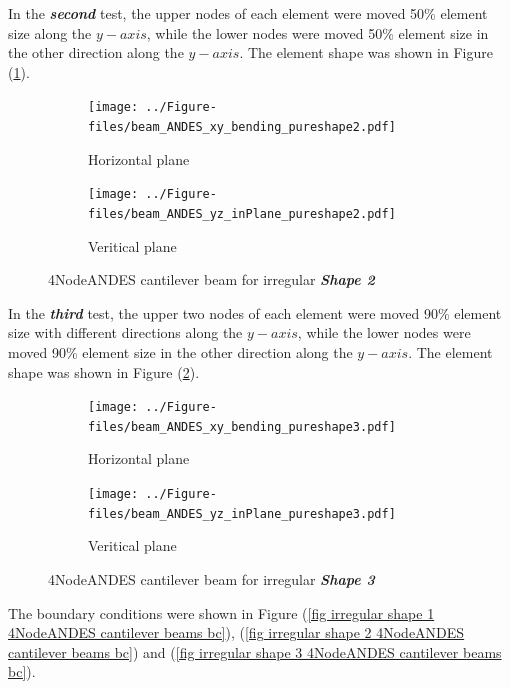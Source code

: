 \documentclass[fleqn,11pt]{article}
\begin{document}
In the \emph{\textbf{second}} test, the upper nodes of each element were moved 50\% element size along the $y-axis$, while the lower nodes were moved 50\% element size in the other direction along the $y-axis$. The element shape was shown in Figure (\ref{fig irregular shape 2 4NodeANDES cantilever beams }).


\begin{figure}[H]
  \centering
    \begin{subfigure}{0.5\textwidth}
      \centering
      \texttt{[image: ../Figure-files/beam\_ANDES\_xy\_bending\_pureshape2.pdf]}
      \caption{Horizontal plane}
    \end{subfigure}
    \begin{subfigure}{0.5\textwidth}
      \centering
      \texttt{[image: ../Figure-files/beam\_ANDES\_yz\_inPlane\_pureshape2.pdf]}
      \caption{Veritical  plane}
    \end{subfigure}
  \caption{4NodeANDES cantilever beam for irregular \textbf{\emph{Shape 2}} }
  \label{fig irregular shape 2 4NodeANDES cantilever beams }
\end{figure}





In the \emph{\textbf{third}} test, the upper two nodes of each element were moved 90\% element size with different directions along the $y-axis$, while the lower nodes  were moved 90\% element size in the other direction along the $y-axis$. The element shape was shown in Figure (\ref{fig irregular shape 3 4NodeANDES cantilever beams }).


\begin{figure}[H]
  \centering
    \begin{subfigure}{0.5\textwidth}
      \centering
      \texttt{[image: ../Figure-files/beam\_ANDES\_xy\_bending\_pureshape3.pdf]}
      \caption{Horizontal plane}
    \end{subfigure}
    \begin{subfigure}{0.5\textwidth}
      \centering
      \texttt{[image: ../Figure-files/beam\_ANDES\_yz\_inPlane\_pureshape3.pdf]}
      \caption{Veritical  plane}
    \end{subfigure}
  \caption{4NodeANDES cantilever beam for irregular \textbf{\emph{Shape 3}} }
  \label{fig irregular shape 3 4NodeANDES cantilever beams }
\end{figure}






The boundary conditions were shown in Figure (\ref{fig irregular shape 1 4NodeANDES cantilever beams bc}), (\ref{fig irregular shape 2 4NodeANDES cantilever beams bc}) and (\ref{fig irregular shape 3 4NodeANDES cantilever beams bc}).
\end{document}
